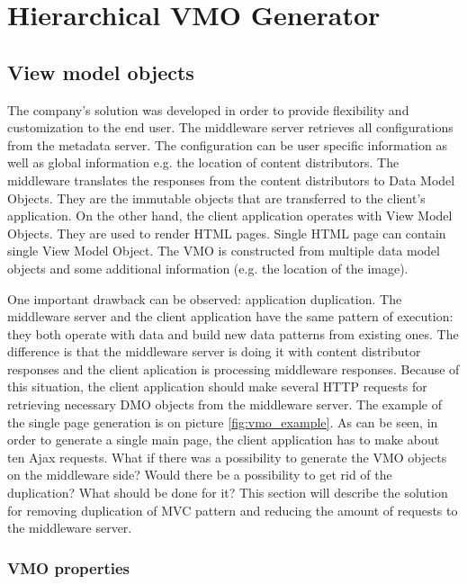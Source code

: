 \section{Hierarchical VMO Generator}

\subsection{View model objects}

The company's solution was developed in order to provide flexibility and customization to the end user. The middleware server retrieves all configurations from the metadata server. The configuration can be user specific information as well as global information e.g. the location of content distributors. The middleware translates the responses from the content distributors to Data Model Objects. They are the immutable objects that are transferred to the client's application. On the other hand, the client application operates with View Model Objects. They are used to render HTML pages. Single HTML page can contain single View Model Object. The VMO is constructed from multiple data model objects and some additional information (e.g. the location of the image).   

One important drawback can be observed: application duplication. The middleware server and the client application have the same pattern of execution: they both operate with data and build new data patterns from existing ones. The difference is that the middleware server is doing it with content distributor responses and the client aplication is processing middleware responses. Because of this situation, the client application should make several HTTP requests for retrieving necessary DMO objects from the middleware server.  The example of the single page generation is on picture \ref{fig:vmo_example}. As can be seen, in order to generate a single main page, the client application has to make about ten Ajax requests. What if there was a possibility to generate the VMO objects on the middleware side? Would there be a possibility to get rid of the duplication? What should be done for it? This section will describe the solution for removing duplication of MVC pattern and reducing the amount of requests to the middleware server. 

\subsubsection{VMO properties}

